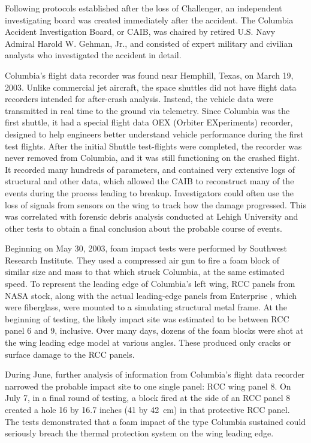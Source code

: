 Following protocols established after the loss of Challenger, an
independent investigating board was created immediately after the
accident. The Columbia Accident Investigation Board, or CAIB, was
chaired by retired U.S. Navy Admiral Harold W. Gehman, Jr., and
consisted of expert military and civilian analysts who investigated the
accident in detail.

Columbia's flight data recorder was found near Hemphill, Texas, on March
19, 2003. Unlike commercial jet aircraft, the space shuttles did not
have flight data recorders intended for after-crash analysis. Instead,
the vehicle data were transmitted in real time to the ground via
telemetry. Since Columbia was the first shuttle, it had a special flight
data OEX (Orbiter EXperiments) recorder, designed to help engineers
better understand vehicle performance during the first test flights.
After the initial Shuttle test-flights were completed, the recorder was
never removed from Columbia, and it was still functioning on the crashed
flight. It recorded many hundreds of parameters, and contained very
extensive logs of structural and other data, which allowed the CAIB to
reconstruct many of the events during the process leading to breakup.
Investigators could often use the loss of signals from sensors on the
wing to track how the damage progressed. This was correlated with
forensic debris analysis conducted at Lehigh University and other tests
to obtain a final conclusion about the probable course of events.

Beginning on May 30, 2003, foam impact tests were performed by Southwest
Research Institute. They used a compressed air gun to fire a foam block
of similar size and mass to that which struck Columbia, at the same
estimated speed. To represent the leading edge of Columbia's left wing,
RCC panels from NASA stock, along with the actual leading-edge panels
from Enterprise , which were fiberglass, were mounted to a simulating
structural metal frame. At the beginning of testing, the likely impact
site was estimated to be between RCC panel 6 and 9, inclusive. Over many
days, dozens of the foam blocks were shot at the wing leading edge model
at various angles. These produced only cracks or surface damage to the
RCC panels.

During June, further analysis of information from Columbia's flight data
recorder narrowed the probable impact site to one single panel: RCC wing
panel 8. On July 7, in a final round of testing, a block fired at the
side of an RCC panel 8 created a hole 16 by 16.7 inches (41 by 42~cm) in
that protective RCC panel. The tests demonstrated that a foam impact of
the type Columbia sustained could seriously breach the thermal
protection system on the wing leading edge.

